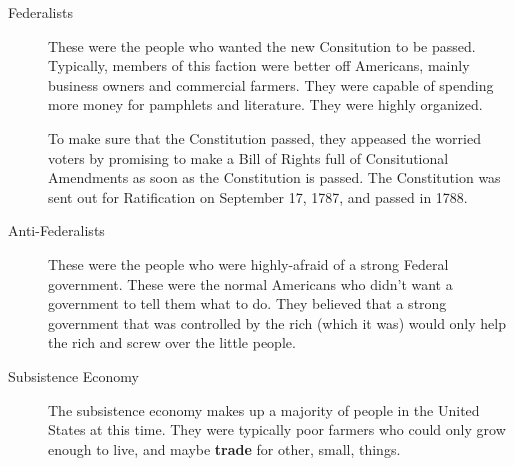 \begin{description}
\item[Federalists] These were the people who wanted the new Consitution to be passed.
  Typically, members of this faction were better off Americans, mainly business owners and commercial farmers.
  They were capable of spending more money for pamphlets and literature.
  They were highly organized.

  To make sure that the Constitution passed, they appeased the worried voters by promising to make a Bill of Rights full of Consitutional Amendments as soon as the Constitution is passed.
  The Constitution was sent out for Ratification on September 17, 1787, and passed in 1788.

\item[Anti-Federalists] These were the people who were highly-afraid of a strong Federal government.
  These were the normal Americans who didn't want a government to tell them what to do.
  They believed that a strong government that was controlled by the rich (which it was) would only help the rich and screw over the little people.

\item[Subsistence Economy] The subsistence economy makes up a majority of people in the United States at this time.
  They were typically poor farmers who could only grow enough to live, and maybe \textbf{trade} for other, small, things.


\end{description}

